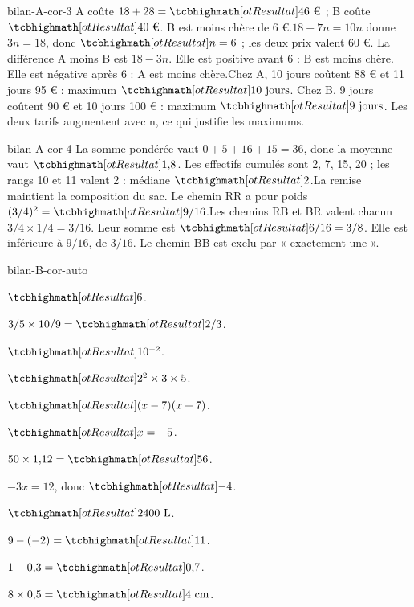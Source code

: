 \begin{blocEdition}{bilan-A-cor-3}
A coûte $18+28=\res{46\text{ €}}$ ; B coûte $\res{40\text{ €}}$. B est moins chère de 6 €.$18+7n=10n$ donne $3n=18$, donc $\res{n=6}$ ; les deux prix valent 60 €. La différence A moins B est $18-3n$. Elle est positive avant 6 : B est moins chère. Elle est négative après 6 : A est moins chère.Chez A, 10 jours coûtent 88 € et 11 jours 95 € : maximum $\res{10\text{ jours}}$. Chez B, 9 jours coûtent 90 € et 10 jours 100 € : maximum $\res{9\text{ jours}}$. Les deux tarifs augmentent avec n, ce qui justifie les maximums.\label{fig-bilan-A-cor-3}

\end{blocEdition}
\begin{blocEdition}{bilan-A-cor-4}
La somme pondérée vaut $0+5+16+15=36$, donc la moyenne vaut $\res{1{,}8}$. Les effectifs cumulés sont 2, 7, 15, 20 ; les rangs 10 et 11 valent 2 : médiane $\res2$.La remise maintient la composition du sac. Le chemin RR a pour poids $(3/4)^2=\res{9/16}$.Les chemins RB et BR valent chacun $3/4\times1/4=3/16$. Leur somme est $\res{6/16=3/8}$. Elle est inférieure à $9/16$, de $3/16$. Le chemin BB est exclu par « exactement une ». \label{fig-bilan-A-cor-4}

\end{blocEdition}
\begin{blocEdition}{bilan-B-cor-auto}
\begin{questions}
\item $\res6$.
\item $3/5\times10/9=\res{2/3}$.
\item $\res{10^{-2}}$.
\item $\res{2^2\times3\times5}$.
\item $\res{(x-7)(x+7)}$.
\item $\res{x=-5}$.
\item $50\times1{,}12=\res{56}$.
\item $-3x=12$, donc $\res{-4}$.
\item $\res{2400\text{ L}}$.
\item $9-(-2)=\res{11}$.
\item $1-0{,}3=\res{0{,}7}$.
\item $8\times0{,}5=\res{4\text{ cm}}$.\end{questions}
\end{blocEdition}
